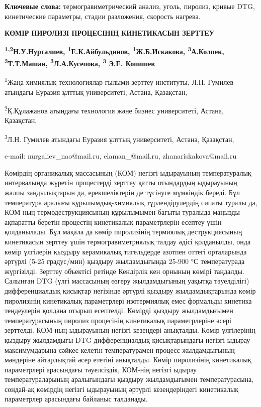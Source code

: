{\bfseries Ключевые слова:} термогравиметрический анализ, уголь, пиролиз,
кривые DTG, кинетические параметры, стадии разложения, скорость нагрева.

\begin{center}
{\large\bfseries КӨМІР ПИРОЛИЗІ ПРОЦЕСІНІҢ КИНЕТИКАСЫН ЗЕРТТЕУ}

{\bfseries \textsuperscript{1,2}Н.У.Нургалиев, \textsuperscript{1}Е.К.Айбульдинов, \textsuperscript{1}Ж.Б.Искакова, \textsuperscript{3}А.Колпек, \textsuperscript{3}Т.Т.Машан, \textsuperscript{3}Л.А.Кусепова, \textsuperscript{3} Э.Е. Копишев}

\textsuperscript{1}Жаңа химиялық технологиялар ғылыми-зерттеу институты,
Л.Н. Гумилев атындағы Еуразия ұлттық университеті, Астана, Қазақстан,

\textsuperscript{2}Қ.Құлажанов атындағы технология және бизнес
университеті, Астана, Қазақстан,

\textsuperscript{3}Л.Н. Гумилев атындағы Еуразия ұлттық университеті,
Астана, Қазақстан,

e-mail: nurgaliev\_nao@mail.ru, elaman\_@mail.ru, zhanariskakova@mail.ru
\end{center}

Көмірдің органикалық массасының (КОМ) негізгі ыдырауының температуралық
интервалында жүретін процестерді зерттеу қатты отындардың ыдырауының
жалпы заңдылықтарын да, ерекшеліктерін де түсінуге мүмкіндік береді. Бұл
температура аралығы құрылымдық-химиялық түрлендірулердің сипаты туралы
да, КОМ-ның термодеструкциясының құрылымымен бағыты туралыда маңызды
ақпаратты беретін процестің кинетикалық параметрлерін есептеу үшін
қолданылады. Бұл мақала да көмір пиролизінің термиялық деструкциясының
кинетикасын зерттеу үшін термогравиметриялық талдау әдісі қолданылды,
онда көмір үлгілерін қыздыру керамикалық тигельдерде азотпен оттегі
орталарында әртүрлі (5-25 градус/мин) қыздыру жылдамдығында 25-900 °С
температурада жүргізілді. Зерттеу объектісі ретінде Кендірлік кен
орнының көмірі таңдалды. Салынған DTG (үлгі массасының өзгеру
жылдамдығының уақытқа тәуелділігі) дифференциалдық қисықтар негізінде
әртүрлі қыздыру жылдамдықтарында көмір пиролизінің кинетикалық
параметрлері изотермиялық емес формальды кинетика теңдеулерін қолдана
отырып есептелді. Көмірді қыздыру жылдамдығымен температурасының пиролиз
процесінің кинетикалық параметрлеріне әсері зерттелді. КОМ-ның
ыдырауының негізгі кезеңдері анықталды. Көмір үлгілерінің қыздыру
жылдамдығы DTG дифференциалдық қисықтарындағы негізгі ыдырау
максимумдарына сәйкес келетін температурамен процесс жылдамдығының
мәндеріне айтарлықтай әсер ететіні анықталды. Көмір пиролизінің
кинетикалық параметрлері арасындағы тәуелсіздік, КОМ-нің негізгі ыдырау
температураларының аралығындағы қыздыру жылдамдығымен температурасына,
сондай-ақ көмірдің негізгі ыдырауының әртүрлі кезеңдеріндегі кинетикалық
параметрлер арасындағы байланыс талданады.


